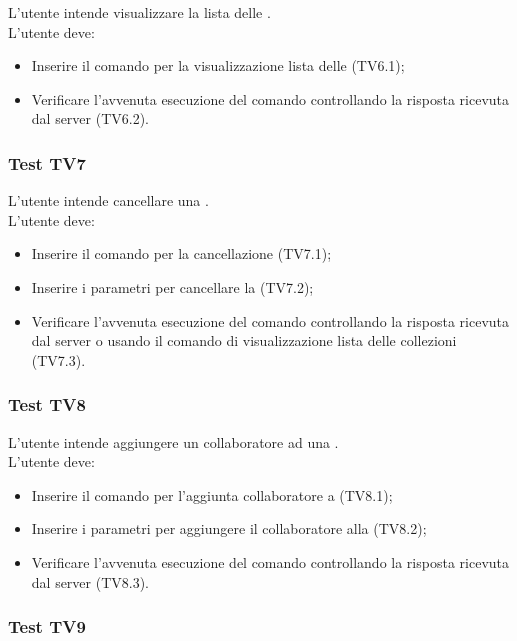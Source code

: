 \documentclass{scalatekids-article}
\begin{document}
L'utente intende visualizzare la lista delle .\\
L'utente deve:
\begin{itemize}
\item Inserire il comando per la visualizzazione lista delle  (TV6.1);
\item Verificare l'avvenuta esecuzione del comando controllando la risposta ricevuta dal server (TV6.2).
\end{itemize}

\subsubsection{Test TV7}

L'utente intende cancellare una .\\
L'utente deve:
\begin{itemize}
\item Inserire il comando per la cancellazione  (TV7.1);
\item Inserire i parametri per cancellare la  (TV7.2);
\item Verificare l'avvenuta esecuzione del comando controllando la risposta ricevuta dal server o usando il comando di visualizzazione lista delle collezioni (TV7.3).
\end{itemize}

\subsubsection{Test TV8}

L'utente intende aggiungere un collaboratore ad una .\\
L'utente deve:
\begin{itemize}
\item Inserire il comando per l'aggiunta collaboratore a  (TV8.1);
\item Inserire i parametri per aggiungere il collaboratore alla   (TV8.2);
\item Verificare l'avvenuta esecuzione del comando controllando la risposta ricevuta dal server (TV8.3).
\end{itemize}


\subsubsection{Test TV9}
\end{document}

